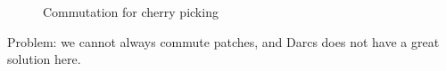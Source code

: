 \begin{figure}
\begin{center}
\end{center}
\caption{Commutation for cherry picking}
\label{fig:darcs-cherry-pick}
\end{figure}

Problem: we cannot always commute patches, and Darcs does not have a great
solution here.